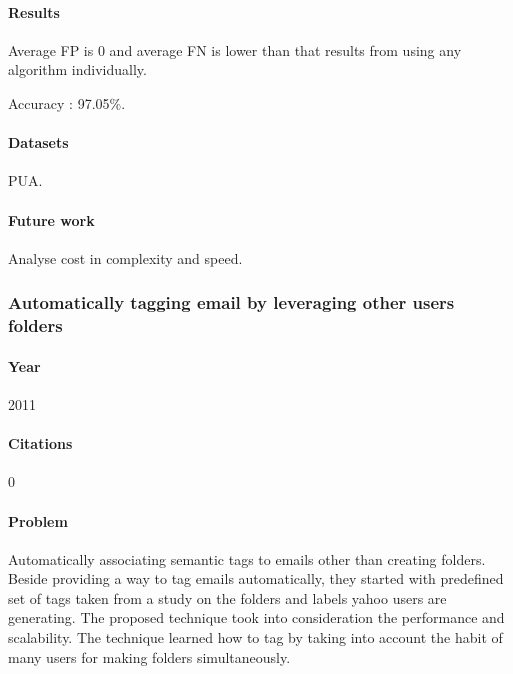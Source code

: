 \documentclass[12pt]{article}
\newenvironment{my_itemize}
{\begin{itemize}
  \setlength{\itemsep}{0cm}
  \setlength{\parskip}{0cm}}
{\end{itemize}}
\begin{document}
\paragraph{Results}
\begin{my_itemize}
  \item Average FP is 0 and average FN is lower than that results from using any algorithm individually.
  \item Accuracy : 97.05\%.
\end{my_itemize}

\paragraph{Datasets}
\begin{my_itemize}
  \item PUA.
\end{my_itemize}

\paragraph{Future work}
\begin{my_itemize}
  \item Analyse cost in complexity and speed.
\end{my_itemize}


\subsubsection{Automatically tagging email by leveraging other users folders \cite{YEHUDA11}}

\paragraph{Year} 2011
\paragraph{Citations} 0

\paragraph{Problem}
\begin{my_itemize}
  \item Automatically associating semantic tags to emails other than creating folders. 
	Beside providing a way to tag emails automatically, they started with predefined 
	set of tags taken from a study on the folders and labels yahoo users are generating. 
	The proposed technique took into consideration the performance and scalability. 
	The technique learned how to tag by taking into account the habit of many users for 
	making folders simultaneously.
\end{my_itemize}
\end{document}
